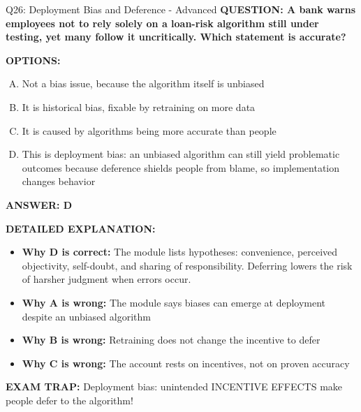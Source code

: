 \documentclass[8pt]{beamer}
\begin{document}
\begin{frame}[shrink=6]{Q26: Deployment Bias and Deference - Advanced}
\fontsize{6.5}{7.5}\selectfont
\textbf{QUESTION: A bank warns employees not to rely solely on a loan-risk algorithm still under testing, yet many follow it uncritically. Which statement is accurate?}

\vspace{0.1cm}
\textbf{OPTIONS:}
\begin{enumerate}[A.]
\item Not a bias issue, because the algorithm itself is unbiased
\item It is historical bias, fixable by retraining on more data
\item It is caused by algorithms being more accurate than people
\item This is deployment bias: an unbiased algorithm can still yield problematic outcomes because deference shields people from blame, so implementation changes behavior
\end{enumerate}

\vspace{0.1cm}
\textcolor{myblue}{\textbf{ANSWER: D}}

\vspace{0.1cm}
\textbf{DETAILED EXPLANATION:}
\begin{itemize}
\item \textbf{Why D is correct:} The module lists hypotheses: convenience, perceived objectivity, self-doubt, and sharing of responsibility. Deferring lowers the risk of harsher judgment when errors occur.
\item \textbf{Why A is wrong:} The module says biases can emerge at deployment despite an unbiased algorithm
\item \textbf{Why B is wrong:} Retraining does not change the incentive to defer
\item \textbf{Why C is wrong:} The account rests on incentives, not on proven accuracy
\end{itemize}

\textcolor{myred}{\textbf{EXAM TRAP:}} Deployment bias: unintended INCENTIVE EFFECTS make people defer to the algorithm!
\end{frame}
\end{document}
